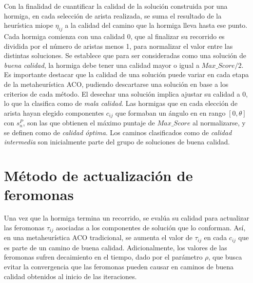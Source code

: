 Con la finalidad de cuantificar la calidad de la soluci\'on construida por una hormiga, en cada selecci\'on de arista realizada, se suma el resultado de la heur\'istica miope $\eta_{ij}$ a la calidad del camino que la hormiga lleva hasta ese punto. Cada hormiga comienza con una calidad 0, que al finalizar su recorrido es dividida por el n\'umero de aristas menos 1, para normalizar el valor entre las distintas soluciones. Se establece que para ser consideradas como una soluci\'on de {\it buena calidad}, la hormiga debe tener una calidad mayor o igual a $Max\_Score/2$. Es importante destacar que la calidad de una soluci\'on puede variar en cada etapa de la metaheur\'istica ACO, pudiendo descartarse una soluci\'on en base a los criterios de cada m\'etodo. El desechar una soluci\'on implica ajustar su calidad a 0, lo que la clasifica como de {\it mala calidad}. Las hormigas que en cada elecci\'on de arista hayan elegido componentes $c_{ij}$ que formaban un \'angulo en en rango $[0, \theta]$ con $s_{n}^{P}$, son las que obtienen el m\'aximo puntaje de $Max\_Score$ al normalizarse, y se definen como de {\it calidad \'optima}. Los caminos clasificados como de {\it calidad intermedia} son inicialmente parte del grupo de soluciones de buena calidad.






\section{M\'etodo de actualizaci\'on de feromonas}
\label{subsec:pheroUpdate}
Una vez que la hormiga termina un recorrido, se eval\'ua su calidad para actualizar las feromonas $\tau_{ij}$ asociadas a los componentes de soluci\'on que lo conforman. As\'i, en una metaheur\'istica ACO tradicional, se aumenta el valor de $\tau_{ij}$ en cada $c_{ij}$ que es parte de un camino de buena calidad. Adicionalmente, los valores de las feromonas sufren decaimiento en el tiempo, dado por el par\'ametro $\rho$, que busca evitar la convergencia que las feromonas pueden causar en caminos de buena calidad obtenidos al inicio de las iteraciones.


